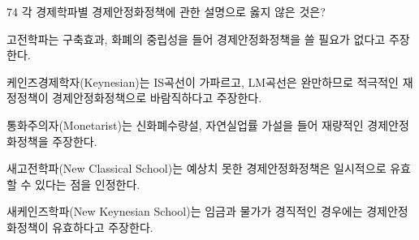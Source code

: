 \begin{question}{74}
각 경제학파별 경제안정화정책에 관한 설명으로 옳지 않은 것은?
\begin{choices}
  \item 고전학파는 구축효과, 화폐의 중립성을 들어 경제안정화정책을 쓸 필요가 없다고 주장한다.
  \item 케인즈경제학자(Keynesian)는 IS곡선이 가파르고, LM곡선은 완만하므로 적극적인 재정정책이 경제안정화정책으로 바람직하다고 주장한다.
  \item 통화주의자(Monetarist)는 신화폐수량설, 자연실업률 가설을 들어 재량적인 경제안정화정책을 주장한다.
  \item 새고전학파(New Classical School)는 예상치 못한 경제안정화정책은 일시적으로 유효할 수 있다는 점을 인정한다.
  \item 새케인즈학파(New Keynesian School)는 임금과 물가가 경직적인 경우에는 경제안정화정책이 유효하다고 주장한다.
\end{choices}
\end{question}
